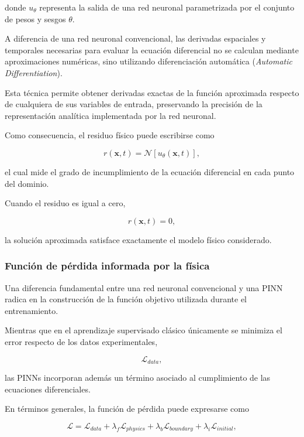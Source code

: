donde $u_{\theta}$ representa la salida de una red neuronal parametrizada por el conjunto de pesos y sesgos $\theta$.

A diferencia de una red neuronal convencional, las derivadas espaciales y temporales necesarias para evaluar la ecuación diferencial no se calculan mediante aproximaciones numéricas, sino utilizando diferenciación automática (\textit{Automatic Differentiation}).

Esta técnica permite obtener derivadas exactas de la función aproximada respecto de cualquiera de sus variables de entrada, preservando la precisión de la representación analítica implementada por la red neuronal.

Como consecuencia, el residuo físico puede escribirse como

\begin{equation}
\boxed{
r(\mathbf{x},t)
=
\mathcal{N}
\left[
u_{\theta}(\mathbf{x},t)
\right],
}
\label{eq:residual}
\end{equation}

el cual mide el grado de incumplimiento de la ecuación diferencial en cada punto del dominio.

Cuando el residuo es igual a cero,

\[
r(\mathbf{x},t)=0,
\]

la solución aproximada satisface exactamente el modelo físico considerado.

\subsubsection{Función de pérdida informada por la física}

Una diferencia fundamental entre una red neuronal convencional y una PINN radica en la construcción de la función objetivo utilizada durante el entrenamiento.

Mientras que en el aprendizaje supervisado clásico únicamente se minimiza el error respecto de los datos experimentales,

\[
\mathcal{L}_{data},
\]

las PINNs incorporan además un término asociado al cumplimiento de las ecuaciones diferenciales.

En términos generales, la función de pérdida puede expresarse como

\begin{equation}
\boxed{
\mathcal{L}
=
\mathcal{L}_{data}
+
\lambda_f
\mathcal{L}_{physics}
+
\lambda_b
\mathcal{L}_{boundary}
+
\lambda_i
\mathcal{L}_{initial},
}
\label{eq:loss_total}
\end{equation}


